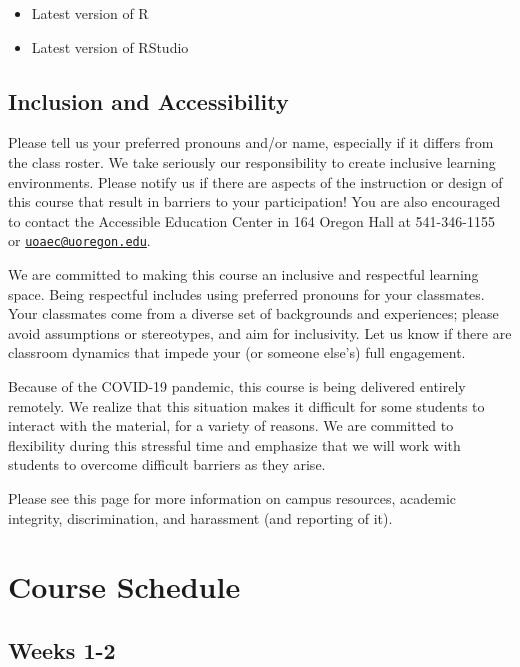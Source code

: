 \documentclass[]{book}
\begin{document}
\begin{itemize}
\item
  Latest version of R
\item
  Latest version of RStudio
\end{itemize}

\hypertarget{inclusion-and-accessibility}{%
\section{Inclusion and Accessibility}\label{inclusion-and-accessibility}}

Please tell us your preferred pronouns and/or name, especially if it differs from the class roster. We take seriously our responsibility to create inclusive learning environments. Please notify us if there are aspects of the instruction or design of this course that result in barriers to your participation! You are also encouraged to contact the Accessible Education Center in 164 Oregon Hall at 541-346-1155 or \href{mailto:uoaec@uoregon.edu}{\nolinkurl{uoaec@uoregon.edu}}.

We are committed to making this course an inclusive and respectful learning space. Being respectful includes using preferred pronouns for your classmates. Your classmates come from a diverse set of backgrounds and experiences; please avoid assumptions or stereotypes, and aim for inclusivity. Let us know if there are classroom dynamics that impede your (or someone else's) full engagement.

Because of the COVID-19 pandemic, this course is being delivered entirely remotely. We realize that this situation makes it difficult for some students to interact with the material, for a variety of reasons. We are committed to flexibility during this stressful time and emphasize that we will work with students to overcome difficult barriers as they arise.

Please see this page for more information on campus resources, academic integrity, discrimination, and harassment (and reporting of it).

\hypertarget{course-schedule}{%
\chapter{Course Schedule}\label{course-schedule}}

\hypertarget{weeks-1-2}{%
\section{Weeks 1-2}\label{weeks-1-2}}
\end{document}
